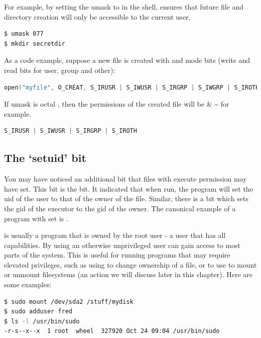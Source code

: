 For example, by setting the umask to  in the shell, ensures that future file and directory creation will only be accessible to the current user,

\begin{lstlisting}[language=bash]
$ umask 077
$ mkdir secretdir
\end{lstlisting}

As a code example, suppose a new file is created with  and mode bits  (write and read bits for user, group and other):

\begin{lstlisting}[language=C]
open("myfile", O_CREAT, S_IRUSR | S_IWUSR | S_IRGRP | S_IWGRP | S_IROTH | S_IWOTH);
\end{lstlisting}

If umask is octal , then the permissions of the created file will be  \& \textasciitilde{} for example.

\begin{lstlisting}[language=C]
S_IRUSR | S_IWUSR | S_IRGRP | S_IROTH
\end{lstlisting}

\subsection{The `setuid' bit}

You may have noticed an additional bit that files with execute permission may have set.
This bit is the  bit.
It indicated that when run, the program will set the uid of the user to that of the owner of the file.
Similar, there is a  bit which sets the gid of the executor to the gid of the owner.
The canonical example of a program with  set is .

 is usually a program that is owned by the root user - a user that has all capabilities.
By using  an otherwise unprivileged user can gain access to most parts of the system.
This is useful for running programs that may require elevated privileges, such as using  to change ownership of a file, or to use  to mount or unmount filesystems (an action we will discuss later in this chapter).
Here are some examples:

\begin{lstlisting}[language=bash]
$ sudo mount /dev/sda2 /stuff/mydisk
$ sudo adduser fred
$ ls -l /usr/bin/sudo
-r-s--x--x  1 root  wheel  327920 Oct 24 09:04 /usr/bin/sudo
\end{lstlisting}

